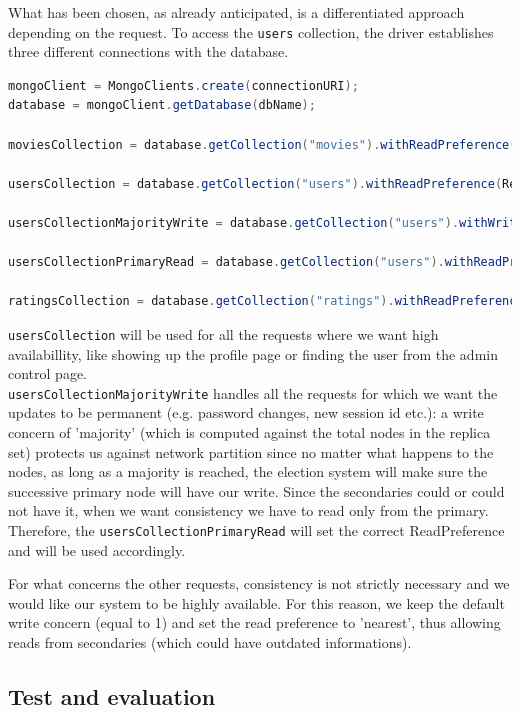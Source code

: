 \documentclass[11pt]{article}
\begin{document}
What has been chosen, as already anticipated, is a differentiated approach depending on the request. To access the \lstinline{users} collection, the driver establishes three different connections with the database.

\begin{lstlisting}[language=java]
mongoClient = MongoClients.create(connectionURI);
database = mongoClient.getDatabase(dbName);

moviesCollection = database.getCollection("movies").withReadPreference(ReadPreference.nearest());

usersCollection = database.getCollection("users").withReadPreference(ReadPreference.nearest());

usersCollectionMajorityWrite = database.getCollection("users").withWriteConcern(WriteConcern.MAJORITY);

usersCollectionPrimaryRead = database.getCollection("users").withReadPreference(ReadPreference.primary());

ratingsCollection = database.getCollection("ratings").withReadPreference(ReadPreference.nearest());
\end{lstlisting}

\lstinline{usersCollection} will be used for all the requests where we want high availabillity, like showing up the profile page or finding the user from the admin control page.
\\
\lstinline{usersCollectionMajorityWrite} handles all the requests for which we want the updates to be permanent (e.g. password changes, new session id etc.): a write concern of 'majority' (which is computed against the total nodes in the replica set) protects us against network partition since no matter what happens to the nodes, as long as a majority is reached, the election system will make sure the successive primary node will have our write. Since the secondaries could or could not have it, when we want consistency we have to read only from the primary. Therefore, the \lstinline{usersCollectionPrimaryRead} will set the correct ReadPreference and will be used accordingly.

For what concerns the other requests, consistency is not strictly necessary and we would like our system to be highly available. For this reason, we keep the default write concern (equal to 1) and set the read preference to 'nearest', thus allowing reads from secondaries (which could have outdated informations).
\subsection{Test and evaluation}
\end{document}
